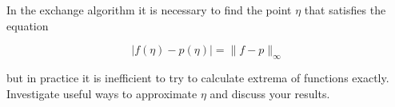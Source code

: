 \begin{problem}
  In the exchange algorithm it is necessary to find the point $\eta$
  that satisfies the equation

  \begin{equation}
    |f (\eta) − p (\eta)| = \|f − p\|_{\infty}
  \end{equation}

  but in practice it is inefficient to try to calculate extrema of
  functions exactly.  Investigate useful ways to approximate $\eta$ and
  discuss your results.
\end{problem}


\begin{solution}

\end{solution}


